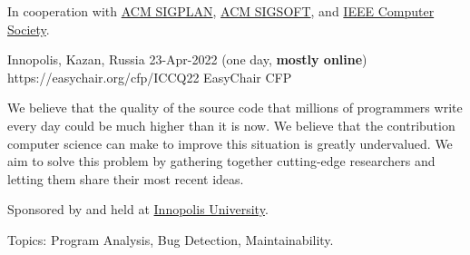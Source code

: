 \documentclass{../cfp}
\begin{document}
\PrintLogo{}



In cooperation
with
\href{https://www.sigplan.org}{ACM SIGPLAN},
\href{https://www.sigsoft.org}{ACM SIGSOFT},\newline
and
\href{https://conferences.ieee.org/conferences_events/conferences/conferencedetails/53703}{IEEE Computer Society}.

\vspace{6pt}

\PrintAddress
  {Innopolis, Kazan, Russia}
  {23-Apr-2022 (one day, \textbf{mostly online})}
  {https://easychair.org/cfp/ICCQ22}
  {EasyChair CFP}

\vspace{12pt}
%
%
%
\vspace{12pt}

We believe that the quality of the source code that millions of programmers
write every day could be much higher than it is now. We believe that the
contribution computer science can make to improve this situation is greatly
undervalued. We aim to solve this problem by gathering
together cutting-edge researchers and letting them share their most recent ideas.

Sponsored by and held at \href{https://innopolis.university/en/}{Innopolis University}.

Topics: Program Analysis, Bug Detection, Maintainability.
\end{document}
